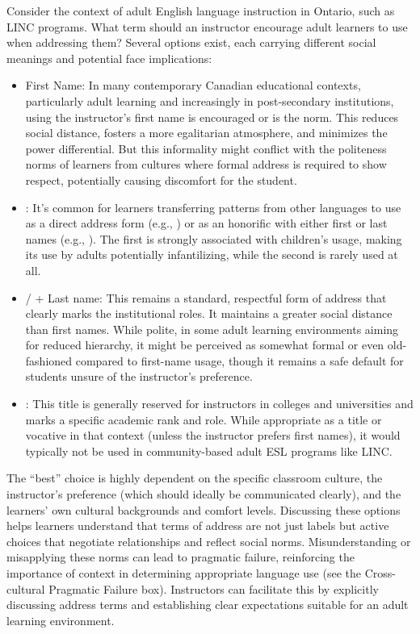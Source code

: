 Consider the context of adult English language instruction in Ontario, such as LINC programs. What term should an instructor encourage adult learners to use when addressing them? Several options exist, each carrying different social meanings and potential face implications:

\begin{itemize}[noitemsep]
    \item First Name: In many contemporary Canadian educational contexts, particularly adult learning and increasingly in post-secondary institutions, using the instructor's first name is encouraged or is the norm. This reduces social distance, fosters a more egalitarian atmosphere, and minimizes the power differential. But this informality might conflict with the politeness norms of learners from cultures where formal address is required to show respect, potentially causing discomfort for the student.
    
    \item {}: It's common for learners transferring patterns from other languages to use  as a direct address form (e.g., ) or as an honorific with either first or last names (e.g., ). The first is strongly associated with children's usage, making its use by adults potentially infantilizing, while the second is rarely used at all.

    \item {}/ + Last name: This remains a standard, respectful form of address that clearly marks the institutional roles. It maintains a greater social distance than first names. While polite, in some adult learning environments aiming for reduced hierarchy, it might be perceived as somewhat formal or even old-fashioned compared to first-name usage, though it remains a safe default for students unsure of the instructor's preference.
    
    \item {}: This title is generally reserved for instructors in colleges and universities and marks a specific academic rank and role. While appropriate as a title or vocative in that context (unless the instructor prefers first names), it would typically not be used in community-based adult ESL programs like LINC.
\end{itemize}

The \enquote{best} choice is highly dependent on the specific classroom culture, the instructor's preference (which should ideally be communicated clearly), and the learners' own cultural backgrounds and comfort levels. Discussing these options helps learners understand that terms of address are not just labels but active choices that negotiate relationships and reflect social norms. Misunderstanding or misapplying these norms can lead to pragmatic failure, reinforcing the importance of context in determining appropriate language use (see the Cross-cultural Pragmatic Failure box). Instructors can facilitate this by explicitly discussing address terms and establishing clear expectations suitable for an adult learning environment.

